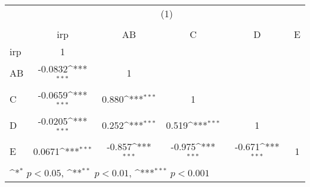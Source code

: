 {
\def\sym#1{\ifmmode^{#1}\else\(^{#1}\)\fi}
\begin{tabular}{l*{5}{c}}
\hline\hline
          &\multicolumn{5}{c}{(1)}                                                                       \\
          &\multicolumn{5}{c}{}                                                                          \\
          &      irp         &       AB         &        C         &        D         &        E         \\
\hline
irp       &        1         &                  &                  &                  &                  \\
AB        &  -0.0832\sym{***}&        1         &                  &                  &                  \\
C         &  -0.0659\sym{***}&    0.880\sym{***}&        1         &                  &                  \\
D         &  -0.0205\sym{***}&    0.252\sym{***}&    0.519\sym{***}&        1         &                  \\
E         &   0.0671\sym{***}&   -0.857\sym{***}&   -0.975\sym{***}&   -0.671\sym{***}&        1         \\
\hline\hline
\multicolumn{6}{l}{\footnotesize \sym{*} \(p<0.05\), \sym{**} \(p<0.01\), \sym{***} \(p<0.001\)}\\
\end{tabular}
}
